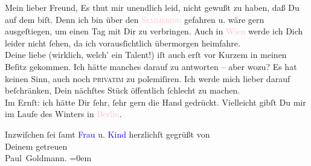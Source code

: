 \pstart{}Mein lieber Freund,\pend
\pstart
           Es thut mir unendlich leid, nicht gewußt zu haben, daß Du auf dem \label{K-L03251-1v}\label{K-L03251-1h} biſt. Denn ich bin
               über den \textsc{\textcolor{pink}{Semmering}{}\ledrightnote{\textcolor{pink}{Semmering}}} gefahren u. wäre gern ausgeſtiegen, um einen Tag mit Dir zu verbringen. Auch in
                  \textcolor{pink}{Wien}{}\ledrightnote{\textcolor{pink}{Wien}} werde ich Dich leider nicht ſehen, da ich
               vorausſichtlich übermorgen heimfahre.{\\}Deine liebe
                  \label{K-L03251-2v}\label{K-L03251-2h} (wirklich, welch’ ein Talent!) iſt auch erſt vor Kurzem {\pb}in meinen Beſitz gekommen. Ich hätte manches darauf
               zu antworten – aber wozu? Es hat keinen Sinn, auch noch \textsc{privatim} zu polemiſiren. Ich werde mich lieber darauf beſchränken, Dein
               nächſtes Stück öffentlich ſchlecht zu machen. {\\}Im Ernſt: ich hätte Dir ſehr, ſehr
               gern die Hand gedrückt. Vielleicht gibſt Du mir im Laufe des Winters \label{K-L03251-3v}\label{K-L03251-3h} in \textcolor{pink}{Berlin}{}\ledrightnote{\textcolor{pink}{Berlin}}. \strikeout{\textcolor{gray}{×}\-\textcolor{gray}{×}}\pend
           
\pstart
           Inzwiſchen ſei ſamt \textcolor{blue}{Frau}{}\ledrightnote{{$\rightarrow$}\textcolor{blue}{Olga Schnitzler}}
               u. \textcolor{blue}{Kind}{}\ledrightnote{{$\rightarrow$}\textcolor{blue}{Heinrich Schnitzler}} herzlichſt gegrüßt
               von {\\[\baselineskip]}Deinem getreuen {\\[\baselineskip]}\spacefill\mbox{Paul Goldmann.}\pend
           \leftskip=0em{}\endnumbering{}  
      
